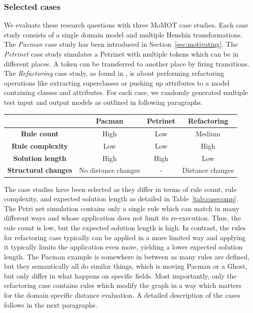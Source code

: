 \subsubsection{Selected cases}

We evaluate these research questions with three MoMOT case studies. Each case study consists of a single domain model and multiple Henshin transformations.
The \textit{Pacman} case study has been introduced in Section~\ref{sec:motivating}. The \textit{Petrinet} case study simulates a Petrinet with multiple tokens which can be in different places. A token can be transferred to another place by firing transitions. The \textit{Refactoring} case study, as found in \cite{?}, is about performing refactoring operations like extracting superclasses or pushing up attributes to a model containing classes and attributes.
For each case, we randomly generated multiple test input and output models as outlined in following paragraphs.

\begin{table}
\centering
\begin{tabular}{|c|c|c|c|}
\hline
 & \textbf{Pacman} & \textbf{Petrinet} & \textbf{Refactoring} \\
\hline
\textbf{Rule count} & High & Low & Medium \\
\hline
\textbf{Rule complexity} & Low & Low & High \\
\hline
\textbf{Solution length} & High & High & Low \\
\hline
\textbf{Structural changes} & No distance changes & - & Distance changes \\
\hline
\end{tabular}
\end{table}

The case studies have been selected as they differ in terms of rule count, rule complexity, and expected solution length as detailed in Table~\ref{tab:casecomp}.
The Petri net simulation contains only a single rule which can match in many different ways and whose application does not limit its re-execution. Thus, the rule count is low, but the expected solution length is high. In contrast, the rules for refactoring case typically can be applied in a more limited way and applying it typically limits the application even more, yielding a lower expected solution length. The Pacman example is somewhere in between as many rules are defined, but they semantically all do similar things, which is moving Pacman or a Ghost, but only differ in what happens on specific fields.
Most importantly, only the refactoring case contains rules which modify the graph in a way which matters for the domain specific distance evaluation. A detailed description of the cases follows in the next paragraphs.

